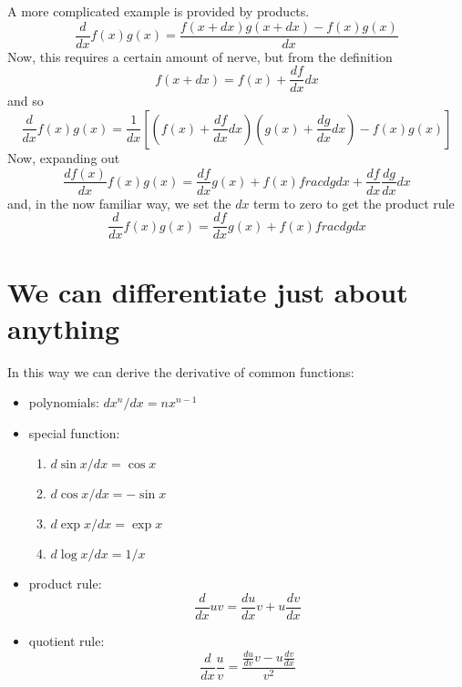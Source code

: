 \documentclass[12pt]{article}
\begin{document}
A more complicated example is provided by products.
\begin{equation}
  \frac{d}{dx}f(x)g(x)=\frac{f(x+dx)g(x+dx)-f(x)g(x)}{dx}
\end{equation}
Now, this requires a certain amount of nerve, but from the definition
\begin{equation}
  f(x+dx)=f(x)+\frac{df}{dx}dx
\end{equation}
and so
\begin{equation}
  \frac{d}{dx}f(x)g(x)=\frac{1}{dx}\left[\left(f(x)+\frac{df}{dx}dx\right)\left(g(x)+\frac{dg}{dx}dx\right)-f(x)g(x)\right]
\end{equation}
Now, expanding out
\begin{equation}
  \frac{df(x)}{dx}f(x)g(x)=\frac{df}{dx}g(x)+f(x)frac{dg}{dx}+\frac{df}{dx}\frac{dg}{dx}dx
\end{equation}
and, in the now familiar way, we set the $dx$ term to zero to get the product rule
\begin{equation}
  \frac{d}{dx}f(x)g(x)=\frac{df}{dx}g(x)+f(x)frac{dg}{dx}
\end{equation}


\section*{We can differentiate just about anything}

In this way we can derive the derivative of common functions:
\begin{itemize}
\item polynomials: $dx^n/dx=nx^{n-1}$
\item special function:
\begin{enumerate}
\item $d\sin{x}/dx=\cos{x}$
\item $d\cos{x}/dx=-\sin{x}$
\item $d\exp{x}/dx=\exp{x}$
\item $d\log{x}/dx=1/x$
  \end{enumerate}
\item product rule:
$$\frac{d}{dx}uv = \frac{du}{dx}v+u\frac{dv}{dx}$$
\item quotient rule:
$$\frac{d}{dx}\frac{u}{v}=\frac{\frac{du}{dv}v-u\frac{dv}{dx}}{v^2}$$
\end{itemize}
\end{document}
